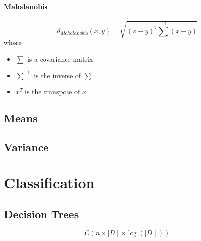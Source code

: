 \documentclass{article}
\begin{document}
                \paragraph{Mahalanobis}
                    \begin{equation*}
                        d_{Mahalanobis}(x,y) = \sqrt{(x-y)^T\textstyle \sum^{-1} (x-y)}
                    \end{equation*}
                    where
                    \begin{itemize}
                        \item $\textstyle \sum$ is a covariance matrix
                        \item $\textstyle \sum^{-1}$ is the inverse of $\textstyle \sum$
                        \item $x^T$ is the transpose of $x$
                    \end{itemize}


                \newpage
                \subsection{Means}
                \subsection{Variance}







        \newpage
        \section{Classification}

            \subsection{Decision Trees}
                \begin{equation*}
                    O(n\times \mid D \mid \times \log(\mid D \mid))
                \end{equation*}
\end{document}
